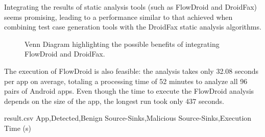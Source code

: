 \begin{finding}
  Integrating the results of static analysis tools
  (such as FlowDroid and DroidFax) seems promising,
  leading to a performance similar to that achieved
  when combining test case generation tools with the
  DroidFax static analysis algorithms. 
\end{finding}

\begin{figure}
  \caption{Venn Diagram highlighting the possible benefits of
    integrating FlowDroid and DroidFax.}
  \label{fig:venn-plot2}

\end{figure}

The execution of FlowDroid is also feasible: the analysis takes only
32.08 seconds per app on average, totaling a processing time of 52
minutes to analyze all 96 pairs of Android apps.
Even though the time to execute the FlowDroid analysis depends on the size
of the app, the longest run took only 437 seconds.


\pgfplotsset{compat=1.9}%
\begin{filecontents*}{result.csv}
   App,Detected,Benign Source-Sinks,Malicious Source-Sinks,Execution Time (s)
   


\end{filecontents*}




